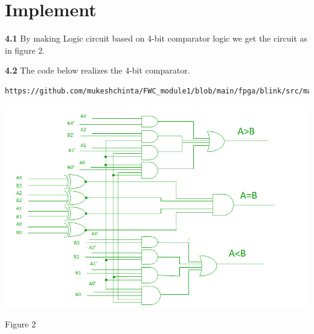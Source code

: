 \documentclass[10pt, a4paper]{article}
\begin{document}
\section{Implement}
\textbf{4.1}
By making Logic circuit based on 4-bit comparator logic we get the circuit as in figure 2.

\textbf{4.2}
The code below realizes the 4-bit comparator.
\begin{lstlisting}
https://github.com/mukeshchinta/FWC_module1/blob/main/fpga/blink/src/main.c
\end{lstlisting}

 \begin{center}
\includegraphics[scale=.40]{4bit.jpg}

\end{center}
\begin{center}
    Figure 2
\end{center}
\end{document}
